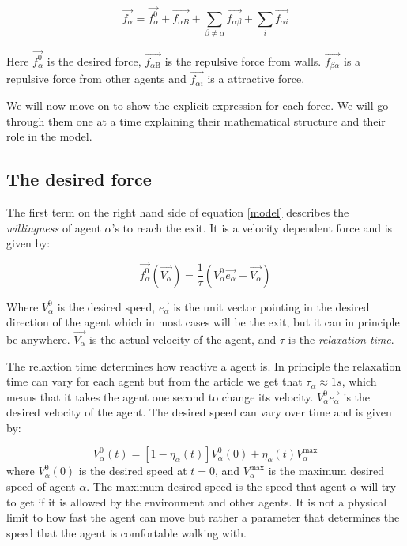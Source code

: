 \begin{equation}\label{model}
    \vec{f_{\alpha}} = \vec{f^{0}_{\alpha}} + \vec{f_{\alpha B}} +
    \sum_{\beta \neq \alpha} \vec{f_{\alpha \beta}} +  
    \sum_{i} \vec{f_{\alpha i}} 
\end{equation}

Here $\vec{f_{\alpha}^{0}}$ is the desired force, $\vec{f_{\alpha 
\text{B}}}$ is the repulsive force from walls. $\vec{f_{\beta\alpha}}$ 
is a repulsive force from other agents and $\vec{f_{\alpha i}}$ is a 
attractive force.

We will now move on to show the explicit expression for each force. We will go 
through them one at a time explaining their mathematical structure and their 
role in the model.

\subsection{The desired force}
The first term on the right hand side of equation \eqref{model} describes the 
\emph{willingness} of agent $\alpha$'s to reach the exit. It is a velocity 
dependent force and is given by:

\begin{equation}\label{relaxtime}
	\vec{f^{0}_{\alpha}}\left( \vec{V_{\alpha}} \right) =
    \frac{1}{\tau}
    \left( V_{\alpha}^{0} \vec{e_{\alpha}} - \vec{V_{\alpha}} \right)
\end{equation}

Where $V_{\alpha}^{0}$ is the desired speed, $ \vec{e_{\alpha}} $ is the unit 
vector pointing in the desired direction of the agent which in most cases will 
be the exit, but it can in principle be anywhere.  $\vec{V_{\alpha}}$ is the 
actual velocity of the agent, and $\tau$ is the \emph{relaxation time}.

The relaxtion time determines how reactive a agent is. In principle the 
relaxation time can vary for each agent but from the article \cite{self-org} 
we get that $ \tau_{\alpha}\approx 1s $, which means that it takes the agent 
one second to change its velocity. $V_{\alpha}^{0} \vec{e_{\alpha}}$ is the desired 
velocity of the agent. The desired speed can vary over time and is given by:

\begin{equation}\label{v0eta}
    V_{\alpha}^{0}\left( t \right) = \left[ 1 - \eta_{\alpha} \left( t \right) \right] 
    V_{\alpha}^{0} \left( 0 \right) +
    \eta_{\alpha} \left( t \right)V_{\alpha}^{\text{max}}
\end{equation}
where $V_{\alpha}^{0} \left( 0 \right)$ is the desired speed at $ t=0 $, and 
$V_{\alpha}^{\text{max}}$ is the maximum desired speed of agent $\alpha$. The 
maximum desired speed is the speed that agent $\alpha$ will try to get if it 
is allowed by the environment and other agents. It is not a physical limit to 
how fast the agent can move but rather a parameter that determines the speed 
that the agent is comfortable walking with. 

